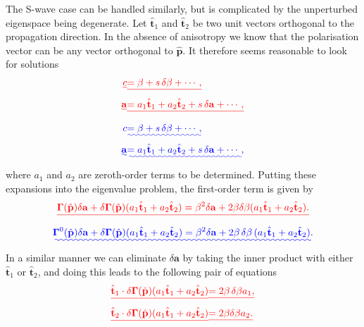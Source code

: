 \documentclass [a4paper,12pt]{paper}
\providecommand{\DIFadd}[1]{{\protect\color{blue}\uwave{#1}}} %
\providecommand{\DIFdel}[1]{{\protect\color{red}\sout{#1}}}                      %
\providecommand{\DIFaddbegin}{} %
\providecommand{\DIFaddend}{} %
\providecommand{\DIFdelbegin}{} %
\providecommand{\DIFdelend}{} %
\begin{document}
The S-wave case can be handled similarly, but is complicated by the unperturbed eigenspace being degenerate. Let $\hat{\mathbf{t}}_{1}$ 
and $\hat{\mathbf{t}}_{2}$ be two unit vectors orthogonal to the propagation direction. In the absence of anisotropy we know that 
the polarisation vector can be any vector orthogonal to $\hat{\mathbf{p}}$. It therefore seems reasonable to look for solutions \DIFdelbegin \begin{eqnarray*}
\DIFdel{c}&\DIFdel{=\beta+s\,\delta\beta+\cdots, }\\
\DIFdel{\mathbf{a}}&\DIFdel{=a_{1}\hat{\mathbf{t}}_{1}+a_{2}\hat{\mathbf{t}}_{2}+s\,\delta \mathbf{a}+\cdots,
}\end{eqnarray*}%
\DIFdelend \DIFaddbegin \DIFadd{of the form
}\begin{align}
\DIFadd{c}&\DIFadd{=\beta+s\,\delta\beta+\cdots, \label{eq:39}}\\
\DIFadd{\mathbf{a}}&\DIFadd{=a_{1}\hat{\mathbf{t}}_{1}+a_{2}\hat{\mathbf{t}}_{2}+s\,\delta \mathbf{a}+\cdots, \label{eq:40}
}\end{align}\DIFaddend 
where $a_{1}$ and $a_{2}$ are zeroth-order terms to be determined. Putting these expansions into the eigenvalue problem, the 
first-order term is given by
\DIFdelbegin \begin{displaymath}
\DIFdel{\bm{\Gamma}(\hat{\mathbf{p}})\delta \mathbf{a}+\delta\bm{\Gamma}(\hat{\mathbf{p}})(a_{1}\hat{\mathbf{t}}_{1}+
a_{2}\hat{\mathbf{t}}_{2})=\beta^{2}\delta \mathbf{a}+2\beta\delta\beta(a_{1}\hat{\mathbf{t}}_{1}+a_{2}\hat{\mathbf{t}}_{2}).
}\end{displaymath}%
\DIFdelend \DIFaddbegin \begin{equation}
\DIFadd{\bm{\Gamma}^{0}(\hat{\mathbf{p}})\delta \mathbf{a}+\delta\bm{\Gamma}(\hat{\mathbf{p}})(a_{1}\hat{\mathbf{t}}_{1}+
a_{2}\hat{\mathbf{t}}_{2})=\beta^{2}\delta \mathbf{a}+2\beta\,\delta\beta\,(a_{1}\hat{\mathbf{t}}_{1}+a_{2}\hat{\mathbf{t}}_{2}).
\label{eq:41}
}\end{equation}\DIFaddend 
In a similar manner we can eliminate $\delta \mathbf{a}$ by taking the inner product with either $\hat{\mathbf{t}}_{1}$ or 
$\hat{\mathbf{t}}_{2}$, and doing this leads to the following pair of equations
\DIFdelbegin \begin{eqnarray*}
\DIFdel{\hat{\mathbf{t}}_{1}\cdot\delta\bm{\Gamma}(\hat{\mathbf{p}})(a_{1}\hat{\mathbf{t}}_{1}+a_{2}\hat{\mathbf{t}}_{2})}&\DIFdel{=2\beta\,\delta\beta a_{1}, }\\
\DIFdel{\hat{\mathbf{t}}_{2}\cdot\delta\bm{\Gamma}(\hat{\mathbf{p}})(a_{1}\hat{\mathbf{t}}_{1}+a_{2}\hat{\mathbf{t}}_{2})}&\DIFdel{=2\beta\delta\beta a_{2}.
}\end{eqnarray*}%
\end{document}
